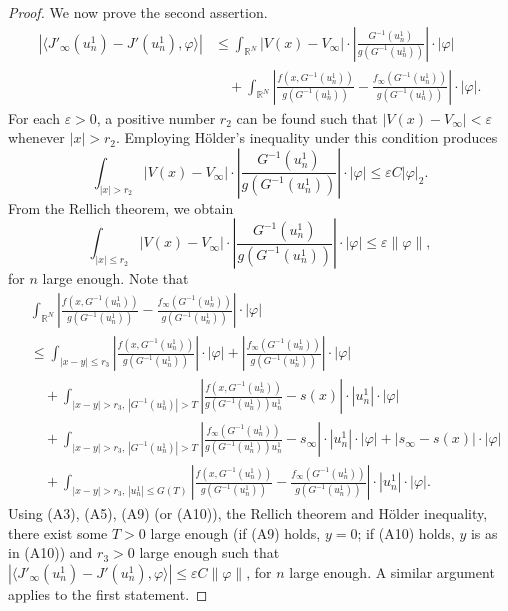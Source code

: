 \documentclass[10pt,a4paper]{amsart}
\numberwithin{equation}{section}
\begin{document}
\begin{proof}
We now prove the second assertion.
 \begin{align*}
|\langle J'_\infty(u^1_n)-J'(u^1_n),\varphi\rangle|
&\leq \int_{\mathbb{R}^N}|V(x)-V_\infty|\cdot |\frac{G^{-1}(u^1_n)}{g(G^{-1}(u^1_n))}|\cdot |\varphi|\\
&\quad +\int_{\mathbb{R}^N}|\frac{f(x,G^{-1}(u^1_n))}{g(G^{-1}(u^1_n))}-\frac{f_\infty(G^{-1}(u^1_n))}{g(G^{-1}(u^1_n))}|\cdot |\varphi|.
 \end{align*}
For each \(\varepsilon > 0\), a positive number \(r_2\) can be found such that 
\(|V(x) - V_\infty| < \varepsilon\) whenever \(|x| > r_2\). Employing H\"older's inequality under 
this condition produces 
$$
\int_{|x|>r_2}|V(x)-V_\infty|\cdot |\frac{G^{-1}(u^1_n)}{g(G^{-1}(u^1_n))}|\cdot |\varphi|\leq\varepsilon C|\varphi|_2.
$$
From the Rellich theorem, we obtain
$$
\int_{|x|\leq r_2}|V(x)-V_\infty|\cdot |\frac{G^{-1}(u^1_n)}{g(G^{-1}(u^1_n))}|\cdot |\varphi|\leq\varepsilon \|\varphi\|,
$$ 
for $n$ large enough.
Note that 
\begin{align*}
&\int_{\mathbb{R}^N}|\frac{f(x,G^{-1}(u^1_n))}{g(G^{-1}(u^1_n))}
 -\frac{f_\infty(G^{-1}(u^1_n))}{g(G^{-1}(u^1_n))}|\cdot |\varphi|\\
&\leq\int_{|x-y|\leq r_3}|\frac{f(x,G^{-1}(u^1_n))}{g(G^{-1}(u^1_n))}|\cdot
  |\varphi|+|\frac{f_\infty(G^{-1}(u^1_n))}{g(G^{-1}(u^1_n))}|\cdot |\varphi|\\
&\quad+\int_{|x-y|>r_3,\,|G^{-1}(u^1_n)|>T}|\frac{f(x,G^{-1}(u^1_n))}{g(G^{-1}(u^1_n))u^1_n}-s(x)|\cdot |u^1_n|\cdot |\varphi|\\
&\quad+\int_{|x-y|>r_3,\,|G^{-1}(u^1_n)|>T}|\frac{f_\infty(G^{-1}(u^1_n))}{g(G^{-1}(u^1_n))u^1_n}-s_\infty|\cdot |u^1_n|\cdot |\varphi|+|s_\infty-s(x)|\cdot |\varphi|\\
&\quad+\int_{|x-y|>r_3,\,|u^1_n|\leq G(T)}|\frac{f(x,G^{-1}(u^1_n))}{g(G^{-1}(u^1_n))}-\frac{f_\infty(G^{-1}(u^1_n))}{g(G^{-1}(u^1_n))}|\cdot |u^1_n|\cdot |\varphi|.
\end{align*}
Using (A3), (A5), (A9) (or (A10)), the Rellich theorem and H\"older inequality, there exist  some $T>0$ large enough (if (A9) holds, $y=0$; if (A10) holds, $y$ is as in (A10)) and $r_3>0$ large enough such that $|\langle J'_\infty(u^1_n)-J'(u^1_n),\varphi\rangle|\leq\varepsilon C \|\varphi\|$, 
for $n$ large enough. A similar argument applies to the first statement.


\end{proof}
\end{document}
